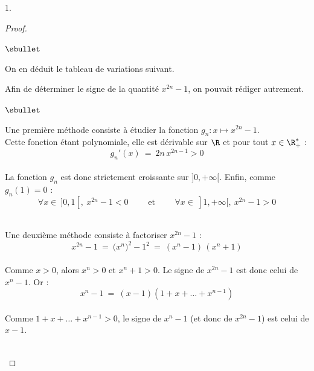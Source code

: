 \documentclass[11pt]{article}%
\begin{document}
\begin{noliste}{1.}
\begin{proof}
\begin{noliste}{$\sbullet$}
    \item On en déduit le tableau de variations suivant.\\[-.2cm]
      \begin{center}
      \end{center}
    \end{noliste}
    \begin{remarkL}{.98}%
      Afin de déterminer le signe de la quantité $x^{2n}-1$, on
      pouvait rédiger autrement.
      \begin{noliste}{$\sbullet$}
      \item Une première méthode consiste à étudier la fonction $g_n :
        x \mapsto x^{2n}-1$.\\
        Cette fonction étant polynomiale, elle est dérivable sur $\R$
        et pour tout $x \in \R_+^*$ :
        \[
        g_n'(x) \ = \ 2n\, x^{2n-1} > 0
        \]
        ~\\[-.7cm]
        La fonction $g_n$ est donc strictement croissante sur $]0,
        +\infty[$. Enfin, comme $g_n(1) = 0$ :
        \[
        \forall x \in \ ]0, 1[, \ x^{2n}-1 < 0 \qquad \text{ et }
        \qquad \forall x \in \ ]1, +\infty[, \ x^{2n}-1 > 0
        \]
        ~\\[-1.3cm]
      \item Une deuxième méthode consiste à factoriser $x^{2n}-1$ :
        \[
        x^{2n}-1 \ = \ \big( x^{n} \big)^2 - 1^2 \ = \ (x^n - 1) \,
        (x^n + 1)
        \]
        ~\\[-.7cm]
        Comme $x> 0$, alors $x^n > 0$ et $x^n + 1 > 0$. Le signe de
        $x^{2n}-1$ est donc celui de $x^n - 1$. Or :
        \[
        x^n - 1 \ = \ (x-1) (1 + x + \ldots + x^{n-1}) %
        \]
        ~\\[-.7cm]
        Comme $1 + x + \ldots + x^{n-1} > 0$, le signe de $x^n - 1$
        (et donc de $x^{2n} - 1$) est celui de $x -1$.
      \end{noliste}
    \end{remarkL}~\\[-1.7cm]
  \end{proof}



\end{noliste}
\end{document}
